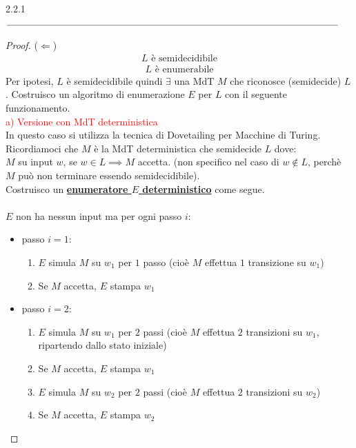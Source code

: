 \documentclass{article}  %
\theoremstyle{definition}
\begin{document}
\begin{theorem}{2.2.1}
	$\rule{\linewidth}{0.3pt}$  %
	\begin{proof} ($\Longleftarrow$) \\
		\begin{align*}
			L \text{ è semidecidibile} \tag*{(ipotesi)}
		\end{align*}
		\begin{align*}
			L \text{ è enumerabile} \tag*{(tesi)}
		\end{align*}
		Per ipotesi, $L$ è semidecidibile quindi $\exists$ una MdT $M$ che riconosce (semidecide) $L$.
		Costruisco un algoritmo di enumerazione $E$ per $L$ con il seguente funzionamento. \\
		\textcolor{red}{a) Versione con MdT deterministica} \\
		In questo caso si utilizza la tecnica di Dovetailing per Macchine di Turing. \\
		Ricordiamoci che $M$ è la MdT deterministica che semidecide $L$ dove: \\
		$M$ su input $w$, se $w \in L \implies M$ accetta. (non specifico nel caso di $w \notin L$, perchè $M$ può non terminare essendo semidecidibile). \\
		Costruisco un \textcolor{green!60!black}{\underline{\textbf{enumeratore $E$ deterministico}}} come segue. \\ \\
		$E$ non ha nessun input ma per ogni passo $i$:
		\begin{itemize}
			\item passo $i=1$:
			      \begin{enumerate}
				      \item $E$ simula $M$ su $w_1$ per $1$ passo (cioè $M$ effettua $1$ transizione su $w_1$)
				      \item Se $M$ accetta, $E$ stampa $w_1$
			      \end{enumerate}
			\item passo $i=2$:
			      \begin{enumerate}
				      \item $E$ simula $M$ su $w_1$ per $2$ passi (cioè $M$ effettua $2$ transizioni su $w_1$, ripartendo dallo stato iniziale)
				      \item Se $M$ accetta, $E$ stampa $w_1$
				      \item $E$ simula $M$ su $w_2$ per $2$ passi (cioè $M$ effettua $2$ transizioni su $w_2$)
				      \item Se $M$ accetta, $E$ stampa $w_2$

\end{enumerate}
\end{itemize}
\end{proof}
\end{theorem}
\end{document}
